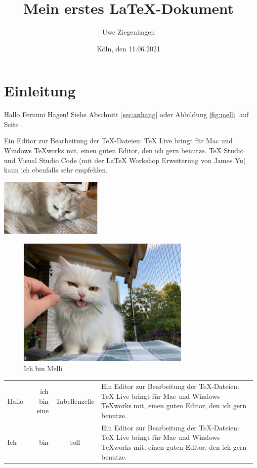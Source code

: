 \documentclass[ngerman,12pt]{scrartcl}
\title{Mein erstes \LaTeX-Dokument}
\author{Uwe Ziegenhagen}
\date{Köln, den 11.06.2021}
\begin{document}
\maketitle

\tableofcontents

\listoffigures

\section{Einleitung}

Hallo Fernuni Hagen! Siehe Abschnitt \ref{sec:anhang} oder Abbildung \ref{fig:melli} auf Seite \pageref{fig:melli}.

Ein Editor zur Bearbeitung der TeX-Dateien: TeX Live bringt für Mac und Windows TeXworks mit, einen guten Editor, den ich gern benutze. 
TeX Studio und Visual Studio Code (mit der LaTeX Workshop Erweiterung von James Yu) kann ich ebenfalls sehr empfehlen.

\includegraphics[width=5cm]{Bilder/miau}


\begin{figure}[t] %
\centering
\includegraphics[width=0.75\textwidth]{Bilder/melli} %
\caption{Ich bin Melli}\label{fig:melli2}
\end{figure}


\blindtext 

\begin{tabular}{lrcp{5cm}}
Hallo & ich bin eine & Tabellenzelle & Ein Editor zur Be\-ar\-beitung der TeX-Dateien: TeX Live bringt für Mac und Windows TeXworks mit, einen guten Editor, den ich gern benutze.  \\
Ich & bin & toll & Ein Editor zur Bearbeitung der TeX-Dateien: TeX Live bringt für Mac und Windows TeXworks mit, einen guten Editor, den ich gern benutze.  \\
\end{tabular}
\end{document}
